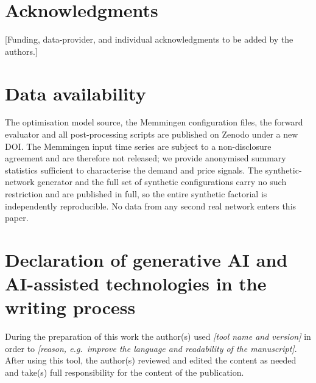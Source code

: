 \documentclass[a4paper,fleqn]{cas-dc}
\begin{document}
\section*{Acknowledgments}
[Funding, data-provider, and individual acknowledgments to be added by the authors.]
\section*{Data availability}
The optimisation model source, the Memmingen configuration files, the forward evaluator and all
post-processing scripts are published on Zenodo under a new DOI. The Memmingen input time series
are subject to a non-disclosure agreement and are therefore not released; we provide anonymised
summary statistics sufficient to characterise the demand and price signals. The synthetic-network
generator and the full set of synthetic configurations carry no such restriction and are
published in full, so the entire synthetic factorial is independently reproducible. No data from
any second real network enters this paper.
\section*{Declaration of generative AI and AI-assisted technologies in the writing process}
During the preparation of this work the author(s) used \emph{[tool name and version]} in order to
\emph{[reason, e.g.\ improve the language and readability of the manuscript]}. After using this
tool, the author(s) reviewed and edited the content as needed and take(s) full responsibility for
the content of the publication.

\appendix
\end{document}
